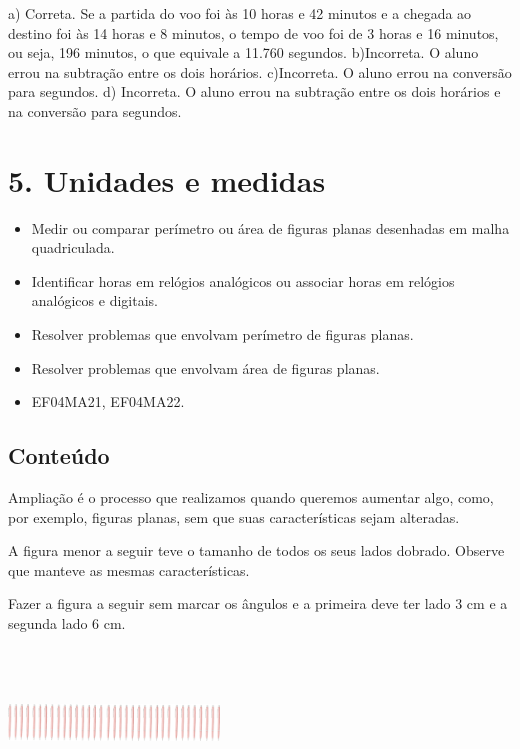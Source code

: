 \begin{enumerate}
\begin{escolha}
\begin{enumerate}
\begin{itemize}
\begin{itemize}
\begin{escolha}
a) Correta. Se a partida do voo foi às 10 horas e 42 minutos e a chegada ao destino foi às 14 horas e 8 minutos, o tempo de voo foi de 3 horas e 16 minutos, ou seja, 196 minutos, o que equivale a 11.760 segundos.
b)Incorreta. O aluno errou na subtração entre os dois horários.
c)Incorreta. O aluno errou na conversão para segundos.
d) Incorreta. O aluno errou na subtração entre os dois horários e na conversão para segundos.


\section{5. Unidades e medidas}\label{muxf3dulo-5}


\begin{itemize}
\item Medir ou comparar perímetro ou área de figuras planas desenhadas em
malha quadriculada.
\item Identificar horas em relógios analógicos ou associar horas em relógios
analógicos e digitais.
\item Resolver problemas que envolvam perímetro de figuras planas.
\item Resolver problemas que envolvam área de figuras planas.
\end{itemize}


\begin{itemize}
\item EF04MA21, EF04MA22.
\end{itemize}

\subsection{Conteúdo}\label{conteuxfado-4}
Ampliação é o processo que realizamos quando queremos aumentar algo,
como, por exemplo, figuras planas, sem que suas características
sejam alteradas.

A figura menor a seguir teve o tamanho de todos os seus lados dobrado. Observe que manteve as mesmas
características.

Fazer a figura a seguir sem marcar os ângulos e a primeira deve ter lado
3 cm e a segunda lado 6 cm.

\includegraphics[width=2.21154in,height=1.55185in]{media/image56.png}


\end{escolha}
\end{itemize}
\end{itemize}
\end{enumerate}
\end{escolha}
\end{enumerate}
